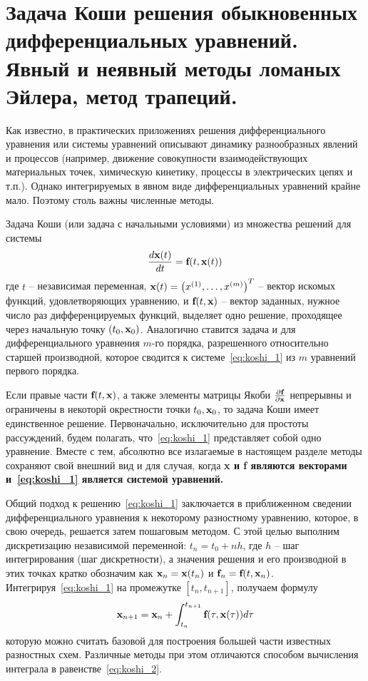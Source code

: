 \documentclass[../../calc-math-exam-2023.tex]{subfiles}
\begin{document}
    \section{Задача Коши решения обыкновенных дифференциальных уравнений. Явный и неявный методы ломаных Эйлера, метод трапеций.}\label{sec:ch24}
    Как известно, в практических приложениях решения дифференциального уравнения или системы уравнений описывают
    динамику разнообразных явлений и процессов (например, движение совокупности взаимодействующих материальных точек,
    химическую кинетику, процессы в электрических цепях и т.п.). Однако интегрируемых в явном виде дифференциальных
    уравнений крайне мало. Поэтому столь важны численные методы.

    Задача Коши (или задача с начальными условиями) из множества решений для системы
    \begin{equation}
        \frac{d\bf{x}(t)}{dt} = \bf{f}(t, \bf{x}(t)) \label{eq:koshi_1}
    \end{equation}
    где $t$ -- независимая переменная, $\bf{x}(t) = \left( x^{(1)}, \ldots, x^{(m)} \right)^T$ -- вектор искомых функций,
    удовлетворяющих уравнению, и $\bf{f}(t, \bf{x})$ -- вектор заданных, нужное число раз дифференцируемых функций,
    выделяет одно решение, проходящее через начальную точку $(t_0, \bf{x}_0)$. Аналогично ставится задача и для
    дифференциального уравнения $m$-го порядка, разрешенного относительно старшей производной, которое сводится к
    системе~\eqref{eq:koshi_1} из $m$ уравнений первого порядка.

    Если правые части $\bf{f}(t, \bf{x})$, а также элементы матрицы Якоби $\frac{\partial \bf{f}}{\partial \bf{x}}$
    непрерывны и ограничены в некоторй окрестности точки $t_0, \bf{x}_0$, то задача Коши имеет единственное решение.
    Первоначально, исключительно для простоты рассуждений, будем полагать, что~\eqref{eq:koshi_1} представляет собой
    одно уравнение. Вместе с тем, абсолютно все излагаемые в настоящем разделе методы сохраняют свой внешний вид и для
    случая, когда \bf{x} и \bf{f} являются векторами и~\eqref{eq:koshi_1} является системой уравнений.

    Общий подход к решению~\eqref{eq:koshi_1} заключается в приближенном сведении дифференциального уравнения к
    некоторому разностному уравнению, которое, в свою очередь, решается затем пошаговым методом. С этой целью
    выполним дискретизацию независимой переменной: $t_n = t_0 + nh$, где $h$ -- шаг интегрирования (шаг дискретности), а
    значения решения и его производной в этих точках кратко обозначим как $\bf{x}_n = \bf{x}(t_n)$ и $\bf{f}_n = \bf{f}(t, \bf{x}_n)$.
    Интегрируя~\eqref{eq:koshi_1} на промежутке $[t_n, t_{n+1}]$, получаем формулу
    \begin{equation}
        \bf{x}_{n+1} = \bf{x}_n + \int_{t_n}^{t_{n+1}} \bf{f}(\tau, \bf{x}(\tau))d\tau \label{eq:koshi_2}
    \end{equation}
    которую можно считать базовой для построения большей части известных разностных схем. Различные методы при этом
    отличаются способом вычисления интеграла в равенстве~\eqref{eq:koshi_2}.
\end{document}

